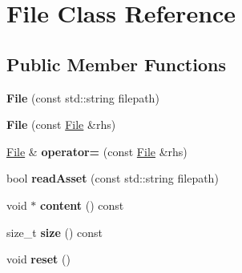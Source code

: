 \hypertarget{class_file}{\section{File Class Reference}
\label{class_file}
}
\subsection*{Public Member Functions}
\begin{DoxyCompactItemize}
\item 
\hypertarget{class_file_ae9a2a3601ff04f1e29debce3b89a05af}{{\bfseries File} (const std\+::string filepath)}\label{class_file_ae9a2a3601ff04f1e29debce3b89a05af}

\item 
\hypertarget{class_file_ae4fbb1b9bb6441d888d3709e8ca82487}{{\bfseries File} (const \hyperlink{class_file}{File} \&rhs)}\label{class_file_ae4fbb1b9bb6441d888d3709e8ca82487}

\item 
\hypertarget{class_file_a0bd4daaa003b47af353b57d907f8fe5a}{\hyperlink{class_file}{File} \& {\bfseries operator=} (const \hyperlink{class_file}{File} \&rhs)}\label{class_file_a0bd4daaa003b47af353b57d907f8fe5a}

\item 
\hypertarget{class_file_a504d60bab14f687e93493c435b151ed2}{bool {\bfseries read\+Asset} (const std\+::string filepath)}\label{class_file_a504d60bab14f687e93493c435b151ed2}

\item 
\hypertarget{class_file_af4e4b07960d2e886fe77d619a9276a35}{void $\ast$ {\bfseries content} () const }\label{class_file_af4e4b07960d2e886fe77d619a9276a35}

\item 
\hypertarget{class_file_a029e45904677c181f85b27e2efdb9a59}{size\+\_\+t {\bfseries size} () const }\label{class_file_a029e45904677c181f85b27e2efdb9a59}

\item 
\hypertarget{class_file_a318f258c3d01d45987cd9ec1b65f4f39}{void {\bfseries reset} ()}\label{class_file_a318f258c3d01d45987cd9ec1b65f4f39}

\end{DoxyCompactItemize}

